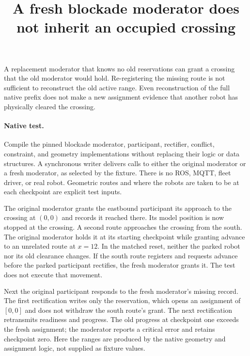 \documentclass[11pt]{article}
\title{A fresh blockade moderator does not inherit an occupied crossing}
\begin{document}
\maketitle

A replacement moderator that knows no old reservations can grant a
crossing that the old moderator would hold. Re-registering the missing
route is not sufficient to reconstruct the old active range. Even
reconstruction of the full native prefix does not make a new assignment
evidence that another robot has physically cleared the crossing.

\paragraph{Native test.}
Compile the pinned blockade moderator, participant, rectifier,
conflict, constraint, and geometry implementations without replacing
their logic or data structures. A synchronous writer delivers calls
to either the original moderator or a fresh moderator, as selected
by the fixture. There is no ROS, MQTT, fleet driver, or real robot.
Geometric routes and where the robots are taken to be at each
checkpoint are explicit test inputs.

The original moderator grants the eastbound participant its approach
to the crossing at \((0,0)\) and records it reached there. Its model
position is now stopped at the crossing. A second route approaches
the crossing from the south. The original moderator holds it at its
starting checkpoint while granting advance to an unrelated route at
\(x=12\). In the matched reset, neither the parked robot nor its old
clearance changes. If the south route registers and requests advance
before the parked participant rectifies, the fresh moderator grants
it. The test does not execute that movement.

Next the original participant responds to the fresh moderator's
missing record. The first rectification writes only the reservation,
which opens an assignment of \([0,0]\) and does not withdraw the
south route's grant. The next rectification retransmits readiness
and progress. The old progress at checkpoint one exceeds the fresh
assignment; the moderator reports a critical error and retains
checkpoint zero. Here the ranges are produced by the native geometry
and assignment logic, not supplied as fixture values.
\end{document}
